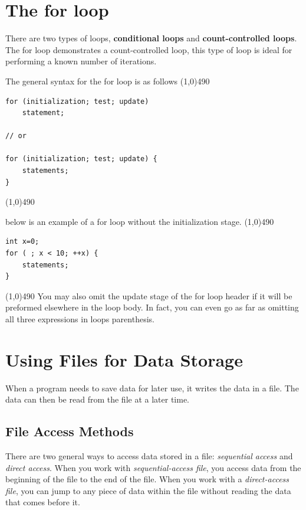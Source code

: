 \documentclass{report}
\begin{document}
    \section{\LARGE The for loop}
    \bigbreak \noindent 
    \begin{concept}
 There are two types of loops, \textbf{conditional loops} and \textbf{count-controlled loops}. The for loop demonstrates a count-controlled loop, this type of loop is ideal for performing a known number of iterations.
	\end{concept}
    \bigbreak \noindent 
    The general syntax for the for loop is as follows
    \bigbreak \noindent 
    \line(1,0){490}
    \begin{verbatim}
for (initialization; test; update)  
    statement;

// or

for (initialization; test; update) { 
    statements;
}
    \end{verbatim}
    \line(1,0){490}

    \bigbreak \noindent 
    \bigbreak \noindent 
    below is an example of a for loop without the initialization stage.
    \bigbreak \noindent 
    \line(1,0){490}
    \begin{verbatim}
int x=0;
for ( ; x < 10; ++x) {
    statements;
}

    \end{verbatim}
    \line(1,0){490}
    \bigbreak \noindent 
    You may also omit the update stage of the for loop header if it will be preformed elsewhere in the loop body. In fact, you can even go as far as omitting all three expressions in loops parenthesis.

    \pagebreak \bigbreak \noindent 
    \section{\LARGE Using Files for Data Storage}
    \bigbreak \noindent 
    \begin{concept}
 When a program needs to save data for later use, it writes the data in a file. The data can then be read from the file at a later time.
	\end{concept}
    \bigbreak \noindent 
    \subsection{File Access Methods}
    \bigbreak \noindent 
    There are two general ways to access data stored in a file: \textit{sequential access} and \textit{direct access}. When you work with \textit{sequential-access file}, you access data from the beginning of the file to the end of the file.
    \bigbreak \noindent 
    When you work with a \textit{direct-access file}, you can jump to any piece  of data within the file without reading the data that comes before it.
    \bigbreak \noindent 
\end{document}
